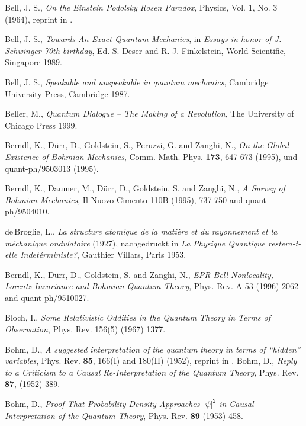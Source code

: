 \begin{thebibliography}{10}
 Bell, J. S., {\em On the Einstein Podolsky Rosen Paradox},
  Physics, Vol. 1, No. 3 (1964), reprint in  \cite{speakable}. 

 Bell, J. S., {\em Towards An Exact Quantum Mechanics}, in
  {\em Essays in honor of J. Schwinger 70th birthday}, Ed. S. Deser and R. J.
  Finkelstein, World Scientific, Singapore 1989.


 Bell, J. S., {\em Speakable and unspeakable in quantum
  mechanics}, Cambridge University Press, Cambridge 1987. 

 Beller, M., {\em Quantum Dialogue -- The Making of a
  Revolution}, The University of Chicago Press 1999.

 Berndl, K., D\"urr, D., Goldstein, S., Peruzzi, G. and Zanghi, N., {\em On the Global Existence of Bohmian Mechanics}, 
  Comm. Math. Phys. {\bf 173}, 647-673 (1995), und quant-ph/9503013 (1995).  

  Berndl, K., Daumer, M., D\"urr, D., Goldstein, S.  and Zanghi, N., 
  {\em A Survey of Bohmian Mechanics},  Il Nuovo Cimento 110B (1995), 737-750
  and quant-ph/9504010. 

  de\,Broglie, L., {\em La structure atomique de la mati\`ere 
    et du rayonnement et la m\'echanique ondulatoire} (1927), nachgedruckt in
    {\em La Physique Quantique restera-t-elle Indet\'erministe?}, Gauthier
    Villars, Paris 1953.   

 Berndl, K., D\"urr, D., Goldstein, S. and Zanghi, N., {\em
    EPR-Bell Nonlocality, Lorentz Invariance and Bohmian Quantum Theory},
    Phys. Rev. A  53 (1996) 2062 and quant-ph/9510027. 


 Bloch, I., {\em Some Relativistic Oddities in the Quantum Theory in Terms of Observation}, Phys. Rev. 156(5) (1967) 1377.

 Bohm, D., {\em A suggested interpretation of the quantum
  theory  in terms of ``hidden'' variables}, Phys. Rev. {\bf 85}, 166(I)
  and 180(II) (1952), reprint in \cite{zurek}.
 Bohm, D., {\em Reply to a Criticism to a Causal Re-Interpretation 
of the Quantum Theory}, Phys. Rev. {\bf 87}, (1952) 389.

 Bohm, D., {\em Proof That Probability Density Approaches
    $|\psi|^2$ in Causal Interpretation of the Quantum Theory}, Phys. Rev. {\bf 89}
    (1953) 458.


\end{thebibliography}
